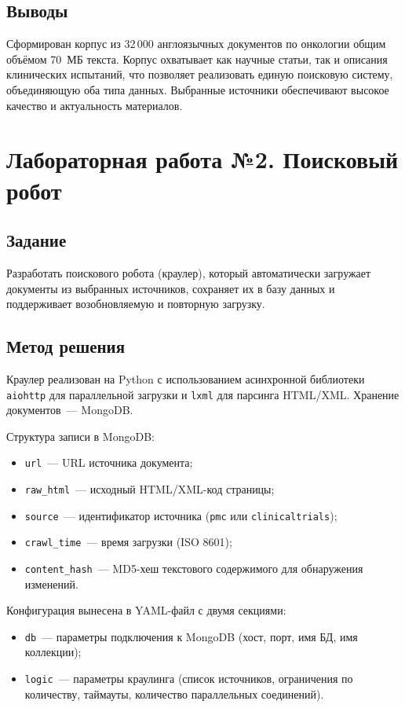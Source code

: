 \documentclass[a4paper,12pt]{article}
\begin{document}
\subsection{Выводы}

Сформирован корпус из 32\,000 англоязычных документов по онкологии общим объёмом 70~МБ текста. Корпус охватывает как научные статьи, так и описания клинических испытаний, что позволяет реализовать единую поисковую систему, объединяющую оба типа данных. Выбранные источники обеспечивают высокое качество и актуальность материалов.

\newpage

\section{Лабораторная работа №2. Поисковый робот}

\subsection{Задание}

Разработать поискового робота (краулер), который автоматически загружает документы из выбранных источников, сохраняет их в базу данных и поддерживает возобновляемую и повторную загрузку.

\subsection{Метод решения}

Краулер реализован на Python с использованием асинхронной библиотеки \texttt{aiohttp} для параллельной загрузки и \texttt{lxml} для парсинга HTML/XML. Хранение документов~--- MongoDB.

Структура записи в MongoDB:
\begin{itemize}
    \item \texttt{url}~--- URL источника документа;
    \item \texttt{raw\_html}~--- исходный HTML/XML-код страницы;
    \item \texttt{source}~--- идентификатор источника (\texttt{pmc} или \texttt{clinicaltrials});
    \item \texttt{crawl\_time}~--- время загрузки (ISO 8601);
    \item \texttt{content\_hash}~--- MD5-хеш текстового содержимого для обнаружения изменений.
\end{itemize}

Конфигурация вынесена в YAML-файл с двумя секциями:
\begin{itemize}
    \item \texttt{db}~--- параметры подключения к MongoDB (хост, порт, имя БД, имя коллекции);
    \item \texttt{logic}~--- параметры краулинга (список источников, ограничения по количеству, таймауты, количество параллельных соединений).
\end{itemize}
\end{document}
